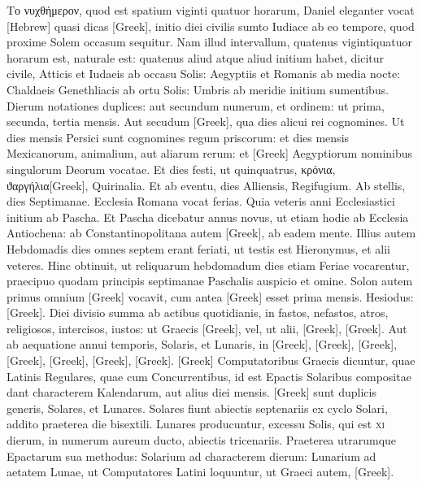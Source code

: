 \textgreek{Το νυχθήμερον},
quod est spatium viginti quatuor horarum, Daniel
eleganter vocat \texthebrew{[Hebrew]} quasi dicas
 \textgreek{[Greek]}, initio diei civilis
sumto Iudiace ab eo tempore, quod proxime Solem occasum
sequitur.
Nam illud intervallum, quatenus vigintiquatuor horarum est,
naturale est: quatenus aliud atque aliud initium habet, dicitur civile,
Atticis et Iudaeis ab occasu Solis: Aegyptiis et Romanis ab media nocte:
Chaldaeis Genethliacis ab ortu Solis: Umbris ab meridie initium
sumentibus.
Dierum notationes duplices: aut secundum numerum, et
ordinem: ut prima, secunda, tertia mensis.
Aut secudum \textgreek{[Greek]},
qua dies alicui rei cognomines.
Ut dies mensis Persici sunt cognomines
regum priscorum: et dies mensis Mexicanorum, animalium, aut aliarum
rerum: et \textgreek{[Greek]} Aegyptiorum nominibus singulorum Deorum
vocatae.
Et dies festi, ut quinquatrus, \textgreek{κρόνια},
\textgreek{ϑαργήλια[Greek]}, Quirinalia.
Et ab eventu, dies Alliensis, Regifugium.
Ab stellis, dies Septimanae.
Ecclesia Romana vocat ferias.
Quia veteris anni Ecclesiastici initium
ab Pascha.
Et Pascha dicebatur annus novus, ut etiam hodie ab Ecclesia
Antiochena: ab Constantinopolitana autem \textgreek{[Greek]},
ab eadem mente.
Illius autem Hebdomadis dies omnes septem erant
feriati, ut testis est Hieronymus, et alii veteres.
Hinc obtinuit, ut reliquarum
hebdomadum dies etiam Feriae vocarentur, praecipuo quodam
principis septimanae Paschalis auspicio et omine.
Solon autem
primus omnium \textgreek{[Greek]} vocavit,
 cum antea \textgreek{[Greek]} esset
prima mensis.
Hesiodus: \textgreek{[Greek]}.
Diei divisio summa ab actibus quotidianis, in fastos, nefastos, atros,
religiosos, intercisos, iustos: ut Graecis
 \textgreek{[Greek]}, vel, ut alii,
\textgreek{[Greek]},
 \textgreek{[Greek]}.
Aut ab aequatione annui
temporis, Solaris, et Lunaris, in \textgreek{[Greek]},
 \textgreek{[Greek]}, \textgreek{[Greek]},
\textgreek{[Greek]}, \textgreek{[Greek]},
 \textgreek{[Greek]}, \textgreek{[Greek]}.
\textgreek{[Greek]} Computatoribus
Graecis dicuntur, quae Latinis Regulares, quae cum Concurrentibus,
id est Epactis Solaribus compositae dant characterem Kalendarum,
aut alius diei mensis.
\textgreek{[Greek]} sunt duplicis generis, Solares, et
Lunares.
Solares fiunt abiectis septenariis ex cyclo Solari, addito praeterea
die bisextili.
Lunares producuntur, excessu Solis, qui est \textsc{xi} dierum,
in numerum aureum ducto, abiectis tricenariis.
Praeterea utrarumque
Epactarum sua methodus: Solarium ad characterem dierum:
Lunarium ad aetatem Lunae, ut Computatores Latini loquuntur, ut
Graeci autem, \textgreek{[Greek]}.

